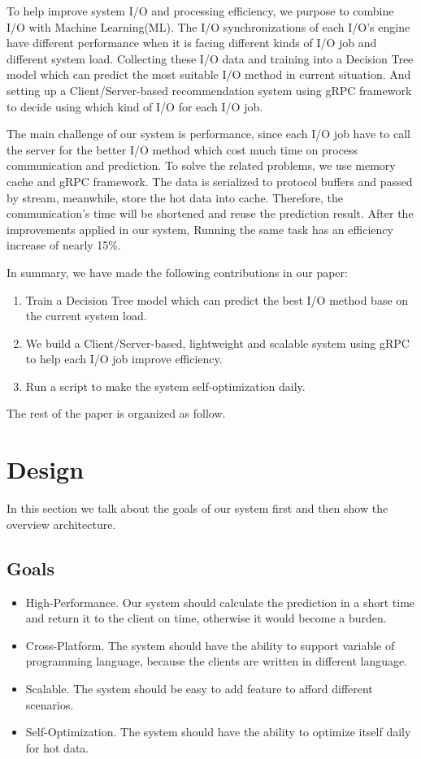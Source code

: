 \documentclass[conference]{IEEEtran}
\begin{document}
To help improve system I/O and processing efficiency, we purpose to combine I/O with Machine Learning(ML). The I/O synchronizations of each I/O's engine 
have different performance when it is facing different kinds of I/O job and different system load. Collecting these I/O data and training into a Decision Tree model 
which can predict the most suitable I/O method in current situation. And setting up a Client/Server-based recommendation system using gRPC framework to decide using which kind of I/O for each I/O job.


The main challenge of our system is performance, since each I/O job have to call the server for the better I/O method which cost much time on process communication and prediction.
To solve the related problems, we use memory cache and gRPC framework. The data is serialized to protocol buffers and passed by stream, meanwhile, store the hot data into cache.
Therefore, the communication's time will be shortened and reuse the prediction result. After the improvements applied in our system, Running the same task has an efficiency increase of nearly 15\%.

In summary, we have made the following contributions in our paper:
\begin{enumerate}
    \item Train a Decision Tree model which can predict the best I/O method base on the current system load.
    \item We build a Client/Server-based, lightweight and scalable system using gRPC to help each I/O job improve efficiency.
    \item Run a script to make the system self-optimization daily.
\end{enumerate}

The rest of the paper is organized as follow.





\section{Design}
In this section we talk about the goals of our system first and then show the overview architecture.
\subsection{Goals}
\begin{itemize}
    \item High-Performance. Our system should calculate the prediction in a short time and return it to the client on time, otherwise it would become a burden.
    \item Cross-Platform. The system should have the ability to support variable of programming language, because the clients are written in different language.
    \item Scalable. The system should be easy to add feature to afford different scenarios.
    \item Self-Optimization. The system should have the ability to optimize itself daily for hot data.
\end{itemize}
\end{document}
